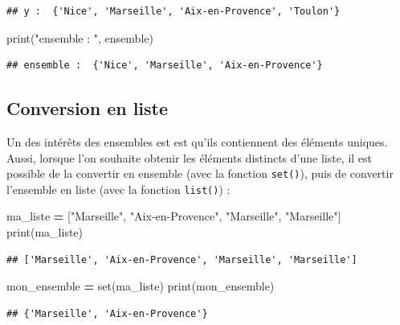 \documentclass[12pt,]{book}
\newenvironment{Shaded}{\begin{snugshade}}{\end{snugshade}}
\newcommand{\StringTok}[1]{\textcolor[rgb]{0.31,0.60,0.02}{#1}}
\newcommand{\OperatorTok}[1]{\textcolor[rgb]{0.81,0.36,0.00}{\textbf{#1}}}
\newcommand{\BuiltInTok}[1]{#1}
\newcommand{\NormalTok}[1]{#1}
\numberwithin{equation}{section}
\numberwithin{countremarque}{section}
\begin{document}
\begin{lstlisting}
## y :  {'Nice', 'Marseille', 'Aix-en-Provence', 'Toulon'}
\end{lstlisting}

\begin{Shaded}
\begin{Highlighting}[]
\BuiltInTok{print}\NormalTok{(}\StringTok{"ensemble : "}\NormalTok{, ensemble)}
\end{Highlighting}
\end{Shaded}

\begin{lstlisting}
## ensemble :  {'Nice', 'Marseille', 'Aix-en-Provence'}
\end{lstlisting}

\subsection{Conversion en liste}\label{conversion-en-liste}

Un des intérêts des ensembles est est qu'ils contiennent des éléments
uniques. Aussi, lorsque l'on souhaite obtenir les éléments distincts
d'une liste, il est possible de la convertir en ensemble (avec la
fonction \texttt{set()}), puis de convertir l'ensemble en liste (avec la
fonction \texttt{list()}) :

\begin{Shaded}
\begin{Highlighting}[]
\NormalTok{ma_liste }\OperatorTok{=}\NormalTok{ [}\StringTok{"Marseille"}\NormalTok{, }\StringTok{"Aix-en-Provence"}\NormalTok{, }\StringTok{"Marseille"}\NormalTok{, }\StringTok{"Marseille"}\NormalTok{]}
\BuiltInTok{print}\NormalTok{(ma_liste)}
\end{Highlighting}
\end{Shaded}

\begin{lstlisting}
## ['Marseille', 'Aix-en-Provence', 'Marseille', 'Marseille']
\end{lstlisting}

\begin{Shaded}
\begin{Highlighting}[]
\NormalTok{mon_ensemble }\OperatorTok{=} \BuiltInTok{set}\NormalTok{(ma_liste)}
\BuiltInTok{print}\NormalTok{(mon_ensemble)}
\end{Highlighting}
\end{Shaded}

\begin{lstlisting}
## {'Marseille', 'Aix-en-Provence'}
\end{lstlisting}
\end{document}
